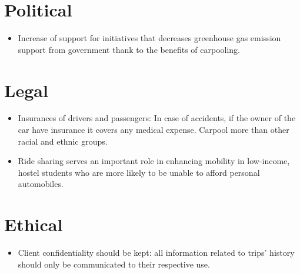 \section*{Political}
\begin{itemize}
\item Increase of support for initiatives that decreases greenhouse gas emission support from government thank to the benefits of carpooling.
\end{itemize}

\section*{Legal}
\begin{itemize}
\item Insurances of drivers and passengers: In case of accidents, if the owner of the car have insurance it covers any medical expense. Carpool more than other racial and ethnic groups.
\item Ride sharing serves an important role in enhancing mobility in low-income, hostel students who are more likely to be unable to afford personal automobiles.
\end{itemize}

\section*{Ethical}
\begin{itemize}
\item Client confidentiality should be kept: all information related to trips’ history should only be communicated to their respective use.
\end{itemize} 
  